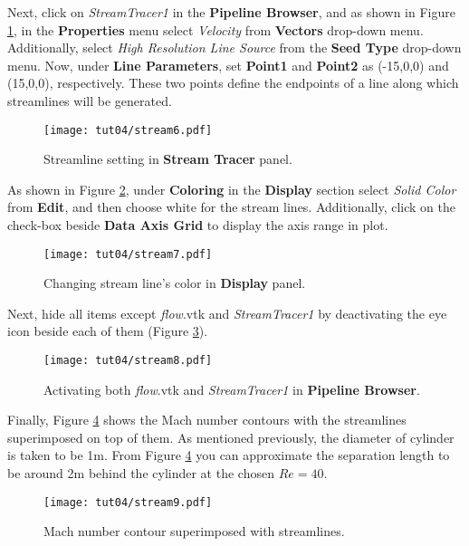 Next, click on \textit{StreamTracer1} in the \textbf{Pipeline Browser}, and as shown in Figure \ref{fig4:stream6_4}, in the \textbf{Properties} menu select \textit{Velocity} from \textbf{Vectors} drop-down menu. Additionally, select \textit{High Resolution Line Source} from the \textbf{Seed Type} drop-down menu. Now, under \textbf{Line Parameters}, set \textbf{Point1} and \textbf{Point2} as (-15,0,0) and (15,0,0), respectively. These two points define the endpoints of a line along which streamlines will be generated.  
\begin{figure}[htbp]
    \centering
    \texttt{[image: tut04/stream6.pdf]}
    \caption{Streamline setting in \textbf{Stream Tracer} panel.}
    \label{fig4:stream6_4}
\end{figure}
As shown in Figure \ref{fig4:stream7_4}, under \textbf{Coloring} in the \textbf{Display} section select \textit{Solid Color} from \textbf{Edit}, and then choose white for the stream lines. Additionally, click on the check-box beside \textbf{Data Axis Grid} to display the axis range in plot.
\begin{figure}[htbp]
    \centering
    \texttt{[image: tut04/stream7.pdf]}
    \caption{Changing stream line's color in \textbf{Display} panel.}
    \label{fig4:stream7_4}
\end{figure}
Next, hide all items except \textit{flow}.vtk and \textit{StreamTracer1} by deactivating the eye icon beside each of them (Figure \ref{fig4:stream8_4}).
\begin{figure}[htbp]
    \centering
    \texttt{[image: tut04/stream8.pdf]}
    \caption{Activating both \textit{flow}.vtk and \textit{StreamTracer1} in \textbf{Pipeline Browser}.}
    \label{fig4:stream8_4}
\end{figure}
Finally, Figure \ref{fig4:stream9_4} shows the Mach number contours with the streamlines superimposed on top of them. As mentioned previously, the diameter of cylinder is taken to be 1m. From Figure \ref{fig4:stream9_4} you can approximate the separation length to be around 2m behind the cylinder at the chosen $Re=40$.
\begin{figure}[htbp]
    \centering
    \texttt{[image: tut04/stream9.pdf]}
    \caption{Mach number contour superimposed with streamlines.}
    \label{fig4:stream9_4}
\end{figure}

